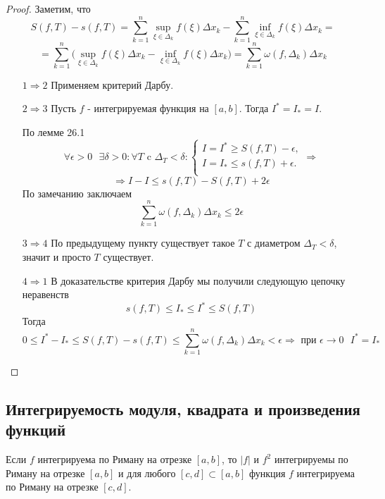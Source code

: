     \begin{proof}
    	Заметим, что
    	\[ S(f, T) - s(f, T) = \sum_{k = 1}^n \sup_{\xi \in \Delta_k} f(\xi) \Delta x_k - \sum_{k = 1}^n \inf_{\xi \in \Delta_k} f(\xi) \Delta x_k = \]
    	\[ = \sum_{k = 1}^n \bigg(\sup_{\xi \in \Delta_k} f(\xi) \Delta x_k - \inf_{\xi \in \Delta_k} f(\xi) \Delta x_k\bigg) = \sum_{k = 1}^n \omega(f, \Delta_k) \Delta x_k \]
    	
    	\begin{enumerate}
    		\item[$1 \Rightarrow 2$] Применяем критерий Дарбу.
    		\item[$2 \Rightarrow 3$] Пусть $f$ - интегрируемая функция на $[a, b]$. Тогда $I^{*} = I_{*} = I$.
    		
    		По лемме 26.1
    		\[ \forall \epsilon > 0 \text{ } \exists \delta > 0: \forall T \text{ c } \Delta_T < \delta:
    		\displaystyle \left\{{
    			\begin{matrix}
    				I = I^{*} \geqslant S(f, T) - \epsilon, \\
    				I = I_{*} \leqslant s(f, T) + \epsilon. \\
    			\end{matrix}
    		}\right. \Rightarrow \]
    		\[ \Rightarrow I - I \leqslant s(f, T) - S(f, T) + 2\epsilon \]
    		По замечанию заключаем
    		\[ \sum_{k = 1}^n \omega(f, \Delta_k) \Delta x_k \leqslant 2\epsilon \]
    		\item[$3 \Rightarrow 4$] По предыдущему пункту существует такое $T$ с диаметром $\Delta_T < \delta$, значит и просто $T$ существует.
    		\item[$4 \Rightarrow 1$] В доказательстве критерия Дарбу мы получили следующую цепочку неравенств
    	    \[ s(f, T) \leqslant I_{*} \leqslant I^{*} \leqslant S(f, T) \]
    	    Тогда
    	    \[ 0 \leqslant I^{*} - I_{*} \leqslant S(f, T) - s(f, T) \leqslant \sum_{k = 1}^n \omega(f, \Delta_k) \Delta x_k < \epsilon \Rightarrow \text{ при } \epsilon \to 0 \text{ } I^{*} = I_{*} \]
    	\end{enumerate}
    \end{proof}
    
     \subsection{Интегрируемость модуля, квадрата и произведения функций}
    
    \begin{corollary}
    	Если $f$ интегрируема по Риману на отрезке $[a, b]$, то $|f|$ и $f^2$ интегрируемы по Риману на отрезке $[a, b]$ и для любого $[c, d] \subset [a, b]$ функция $f$ интегрируема по Риману на отрезке
    	$[c, d]$.
    \end{corollary}
    
